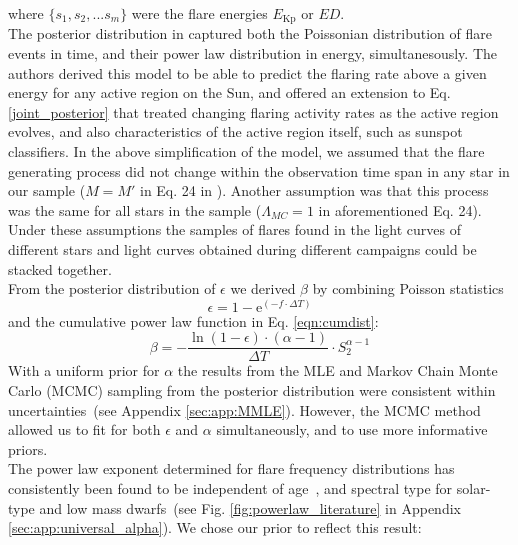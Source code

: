 \documentclass{aa}
\begin{document}
where $\{s_1,s_2,...s_m\}$ were the flare energies $E_\mathrm{Kp}$ or $ED$.
\\
The posterior distribution in \citet{wheatland_flaresbayes_2004} captured both the Poissonian distribution of flare events in time, and their power law distribution in energy, simultanesously. The authors derived this model to be able to predict the flaring rate above a given energy for any active region on the Sun, and offered an extension to Eq. \ref{joint_posterior} that treated changing flaring activity rates as the active region evolves, and also characteristics of the active region itself, such as sunspot classifiers. In the above simplification of the model, we assumed that the flare generating process did not change within the observation time span in any star in our sample ($M=M'$ in Eq. 24 in \citet{wheatland_flaresbayes_2004}). Another assumption was that this process was the same for all stars in the sample ($\Lambda_{MC}=1$ in aforementioned Eq. 24). Under these assumptions the samples of flares found in the light curves of different stars and light curves obtained during different campaigns could be stacked together.
\\
From the posterior distribution of $\epsilon$ we derived $\beta$ by combining Poisson statistics 
\begin{equation}
\epsilon = 1 - \mathrm{e}^{(-f\cdot\Delta T)}
\label{poissonstats}
\end{equation}
and the cumulative power law function in Eq. \ref{eqn:cumdist}:
\begin{equation}
\beta = - \dfrac{\ln(1 - \epsilon)\cdot (\alpha -1)}{\Delta T} \cdot S_2^{\alpha -1}
\label{eqn:epstobeta}
\end{equation}
With a uniform prior for $\alpha$ the results from the MLE and Markov Chain Monte Carlo (MCMC) sampling from the posterior distribution were consistent within uncertainties~(see Appendix \ref{sec:app:MMLE}). However, the MCMC method allowed us to fit for both $\epsilon$ and $\alpha$ simultaneously, and to use more informative priors. 
\\
The power law exponent determined for flare frequency distributions has consistently been found to be independent of age~\citep{davenport2019}, and spectral type for solar-type and low mass dwarfs~(see Fig. \ref{fig:powerlaw_literature} in Appendix \ref{sec:app:universal_alpha}). We chose our prior to reflect this result: 
\end{document}
